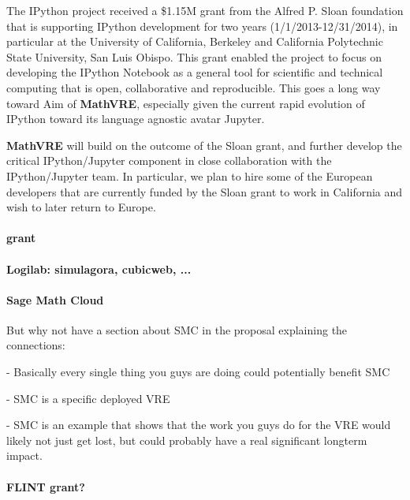 \documentclass[a4paper,11pt]{article}
\newcommand{\XX}{\textbf{MathVRE}\xspace}
\newcommand{\TheProject}{\XX}
\begin{document}
The IPython project received a \$1.15M grant from the Alfred P. Sloan
foundation that is supporting IPython development for two years
(1/1/2013-12/31/2014), in particular at the University of California,
Berkeley and California Polytechnic State University, San Luis Obispo.
This grant enabled the project to focus on developing the IPython
Notebook as a general tool for scientific and technical computing that
is open, collaborative and reproducible. This goes a long way toward
Aim  of \TheProject, especially given the current
rapid evolution of IPython toward its language agnostic avatar
Jupyter.

\TheProject will build on the outcome of the Sloan grant, and further
develop the critical IPython/Jupyter component in close collaboration
with the IPython/Jupyter team. In particular, we plan to hire some of
the European developers that are currently funded by the Sloan grant
to work in California and wish to later return to Europe.

\paragraph{\SageCombinat grant}

\paragraph{Logilab: simulagora, cubicweb, ...}


\paragraph{Sage Math Cloud}


But why not have a section about SMC in the proposal explaining the connections:

  - Basically every single thing you guys are doing could potentially
benefit SMC

  - SMC is a specific deployed VRE

  - SMC is an example that shows that the work you guys do for the VRE
would likely not just get lost, but could probably have a real
significant longterm impact.

\paragraph{FLINT grant?}
\end{document}

